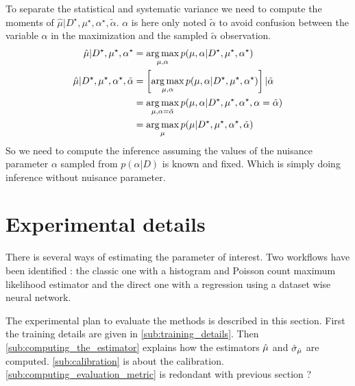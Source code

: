 To separate the statistical and systematic variance we need to compute the moments of $\hat \mu | D^\star, \mu^\star, \alpha^\star, \tilde \alpha$.
$\alpha$ is here only noted $\tilde \alpha$ to avoid confusion between the variable $\alpha$ in the maximization and the sampled $\tilde \alpha$ observation. 
\begin{align}
\hat \mu | D^\star, \mu^\star, \alpha^\star & = \operatorname*{arg\,max}_{\mu, \alpha} p(\mu, \alpha| D^\star, \mu^\star, \alpha^\star) \\
\hat \mu | D^\star, \mu^\star, \alpha^\star, \tilde \alpha & = \left[ \operatorname*{arg\,max}_{\mu, \alpha} p(\mu, \alpha| D^\star, \mu^\star, \alpha^\star) \right] | \tilde \alpha \\
	& = \operatorname*{arg\,max}_{\mu, \alpha=\tilde \alpha} p(\mu, \alpha| D^\star, \mu^\star, \alpha^\star, \alpha = \tilde \alpha) \\
	& = \operatorname*{arg\,max}_{\mu} p(\mu | D^\star, \mu^\star, \alpha^\star, \tilde \alpha) \\
\end{align}
So we need to compute the inference assuming the values of the nuisance parameter $\alpha$ sampled from $p(\alpha|D)$ is known and fixed.
Which is simply doing inference without nuisance parameter.












\section{Experimental details} %
\label{sec:experimental_details}





There is several ways of estimating the parameter of interest.
Two workflows have been identified : the classic one with a histogram and Poisson count maximum likelihood estimator and the direct one with a regression using a dataset wise neural network.

The experimental plan to evaluate the methods is described in this section.
First the training details are given in \autoref{sub:training_details}.
Then \autoref{sub:computing_the_estimator} explains how the estimators $\hat\mu$ and $\hat\sigma_{\hat\mu}$ are computed.
\autoref{sub:calibration} is about the calibration.
\autoref{sub:computing_evaluation_metric} is redondant with previous section ?

